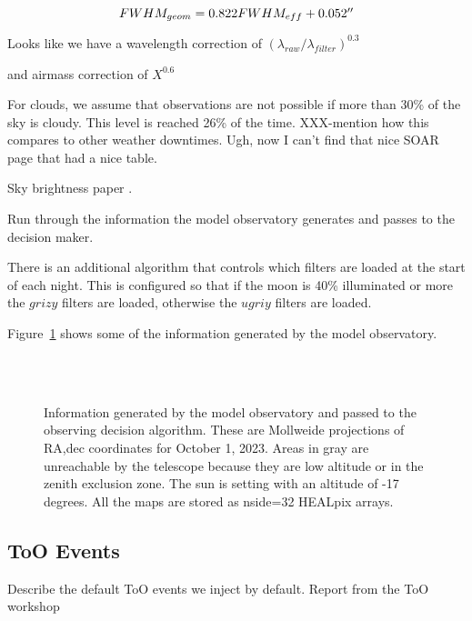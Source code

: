 \documentclass[]{aastex631}
\begin{document}
\begin{equation}
    FWHM_{geom} = 0.822 FWHM_{eff} + 0.052\arcsec
\end{equation}

Looks like we have a wavelength correction of $(\lambda_{raw}/\lambda_{filter})^{0.3}$

and airmass correction of $X^{0.6}$

For clouds, we assume that observations are not possible if more than 30\% of the sky is cloudy. This level is reached 26\% of the time. XXX-mention how this compares to other weather downtimes. Ugh, now I can't find that nice SOAR page that had a nice table.

Sky brightness paper \citep{Yoachim2016}. 


Run through the information the model observatory generates and passes to the decision maker.

There is an additional algorithm that controls which filters are loaded at the start of each night. This is configured so that if the moon is 40\% illuminated or more the $grizy$ filters are loaded, otherwise the $ugriy$ filters are loaded.

Figure~\ref{fig:conditions} shows some of the information generated by the model observatory. 

\begin{figure}
     \\
     \\
    \caption{Information generated by the model observatory and passed to the observing decision algorithm. These are Mollweide projections of RA,dec coordinates for October 1, 2023. Areas in gray are unreachable by the telescope because they are low altitude or in the zenith exclusion zone. The sun is setting with an altitude of -17 degrees. All the maps are stored as nside=32 HEALpix arrays. }
    \label{fig:conditions}
\end{figure}

\subsection{ToO Events}

Describe the default ToO events we inject by default. Report from the ToO workshop \citep{Andreoni2022}
\end{document}
